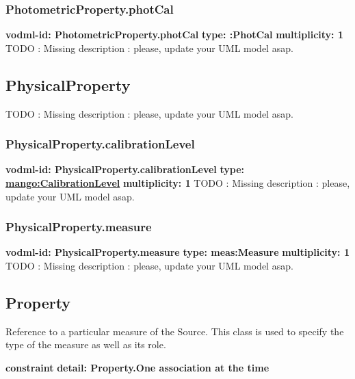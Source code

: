     \subsubsection{PhotometricProperty.photCal}
      \textbf{vodml-id: PhotometricProperty.photCal} \newline
      \textbf{type: :PhotCal} \newline
      \textbf{multiplicity: 1} \newline
      TODO : Missing description : please, update your UML model asap.

  \subsection{PhysicalProperty}
  \label{sect:PhysicalProperty}
    TODO : Missing description : please, update your UML model asap.

    \subsubsection{PhysicalProperty.calibrationLevel}
      \textbf{vodml-id: PhysicalProperty.calibrationLevel} \newline
      \textbf{type: \hyperref[sect:CalibrationLevel]{mango:CalibrationLevel}} \newline
      \textbf{multiplicity: 1} \newline
      TODO : Missing description : please, update your UML model asap.

    \subsubsection{PhysicalProperty.measure}
      \textbf{vodml-id: PhysicalProperty.measure} \newline
      \textbf{type: meas:Measure} \newline
      \textbf{multiplicity: 1} \newline
      TODO : Missing description : please, update your UML model asap.

  \subsection{Property}
  \label{sect:Property}
    Reference to a particular measure of the Source. This class is used to specify the type of the measure as well as its role.

    \noindent \textbf{constraint} \newline
    \indent    \textbf{detail: Property.One association at the time
 }\newline


